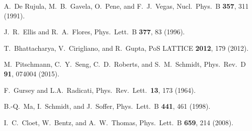 \documentclass[aps,prd,twocolumn,groupedaddress,showpacs,superscriptaddress,floatfix,nofootinbib,10pt]{revtex4-1}
\begin{document}
\begin{thebibliography}{}
  A.~De Rujula, M.~B.~Gavela, O.~Pene, and F.~J.~Vegas,
  Nucl.\ Phys.\ B {\bf 357}, 311 (1991).


  J.~R.~Ellis and R.~A.~Flores,
  Phys.\ Lett.\ B {\bf 377}, 83 (1996).


  T.~Bhattacharya, V.~Cirigliano, and R.~Gupta,
  PoS LATTICE {\bf 2012}, 179 (2012).


  M.~Pitschmann, C.~Y.~Seng, C.~D.~Roberts, and S.~M.~Schmidt,
  Phys.\ Rev.\ D {\bf 91}, 074004 (2015).
  

  F.~Gursey and L.A.~Radicati,
  Phys.\ Rev.\ Lett.\  {\bf 13}, 173 (1964).
  
  
  B.-Q.~Ma, I.~Schmidt, and J.~Soffer,
  Phys.\ Lett.\ B {\bf 441}, 461 (1998).


  I.~C.~Cloet, W.~Bentz, and A.~W.~Thomas,
  Phys.\ Lett.\ B {\bf 659}, 214 (2008).



\end{thebibliography}
\end{document}
